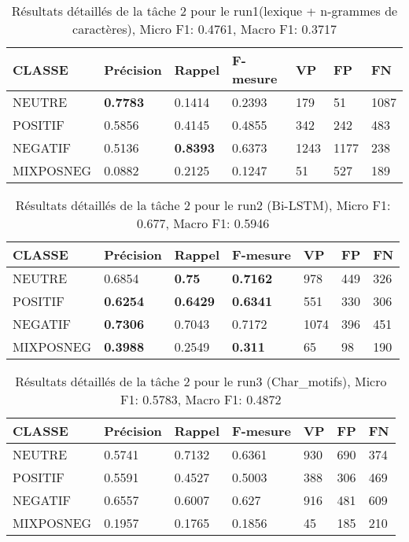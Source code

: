 \begin{table}
\begin{tabular}{l|l|l|l|l|l|l}
  CLASSE	&Précision	&Rappel	&F-mesure	&VP	&FP	&FN\\
\hline
\hline
  NEUTRE	&\textbf{0.7783}	&0.1414	&0.2393	&179	&51	&1087\\
  POSITIF	&0.5856	&0.4145	&0.4855	&342	&242	&483\\
  NEGATIF	&0.5136	&\textbf{0.8393}	&0.6373	&1243	&1177	&238\\
  MIXPOSNEG	&0.0882	&0.2125	&0.1247	&51	&527	&189\\
\hline
\end{tabular}
\caption{Résultats détaillés de la tâche 2 pour le run1(lexique + n-grammes de caractères),
  Micro F1: 0.4761, Macro F1: 0.3717\label{tab:detail1}}
\end{table}

\begin{table}
\begin{tabular}{l|l|l|l|l|l|l}
  CLASSE	&Précision	&Rappel	&F-mesure	&VP	&FP	&FN\\
\hline
\hline
  NEUTRE	&0.6854	&\textbf{0.75}	&\textbf{0.7162}	&978	&449	&326\\
  POSITIF	&\textbf{0.6254}	&\textbf{0.6429}	&\textbf{0.6341}	&551	&330	&306\\
  NEGATIF	&\textbf{0.7306}	&0.7043	&0.7172	&1074	&396	&451\\
  MIXPOSNEG	&\textbf{0.3988}	&0.2549	&\textbf{0.311}	&65	&98	&190\\
\hline
\end{tabular}
\caption{Résultats détaillés de la tâche 2 pour le run2 (Bi-LSTM),
  Micro F1: 0.677, Macro F1: 0.5946\label{tab:detail2}}
\end{table}

\begin{table}
\begin{tabular}{l|l|l|l|l|l|l}
  CLASSE	&Précision	&Rappel	&F-mesure	&VP	&FP	&FN\\
\hline
\hline
  NEUTRE	&0.5741	&0.7132	&0.6361	&930	&690	&374\\
  POSITIF	&0.5591	&0.4527	&0.5003	&388	&306	&469\\
  NEGATIF	&0.6557	&0.6007	&0.627	&916	&481	&609\\
  MIXPOSNEG	&0.1957	&0.1765	&0.1856	&45	&185	&210\\
\hline
\end{tabular}
\caption{Résultats détaillés de la tâche 2 pour le run3 (Char\_motifs),
  Micro F1: 0.5783, Macro F1: 0.4872\label{tab:detail3}}
\end{table}

